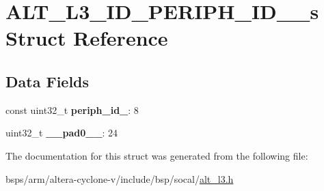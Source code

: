 \hypertarget{structALT__L3__ID__PERIPH__ID__4__s}{}\section{A\+L\+T\+\_\+\+L3\+\_\+\+I\+D\+\_\+\+P\+E\+R\+I\+P\+H\+\_\+\+I\+D\+\_\+\_\+s Struct Reference}
\label{structALT__L3__ID__PERIPH__ID__4__s}
\subsection*{Data Fields}
\begin{DoxyCompactItemize}
\item 
\mbox{\label{structALT__L3__ID__PERIPH__ID__4__s_a6431eb73e2f991869e108b11b6ddc2fc}} 
const uint32\+\_\+t {\bfseries periph\+\_\+id\+\_}\+: 8
\item 
\mbox{\label{structALT__L3__ID__PERIPH__ID__4__s_aebe232e311ca6fe824be0c3fcdca8e3b}} 
uint32\+\_\+t {\bfseries \+\_\+\+\_\+pad0\+\_\+\+\_\+}\+: 24
\end{DoxyCompactItemize}


The documentation for this struct was generated from the following file\+:\begin{DoxyCompactItemize}
\item 
bsps/arm/altera-\/cyclone-\/v/include/bsp/socal/\mbox{\hyperlink{alt__l3_8h}{alt\+\_\+l3.\+h}}\end{DoxyCompactItemize}
